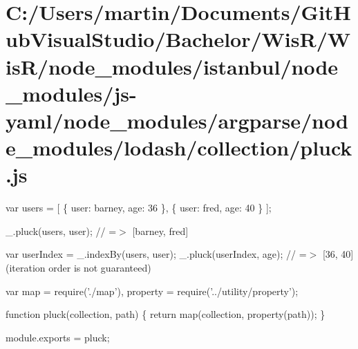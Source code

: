 \hypertarget{_c_1_2_users_2martin_2_documents_2_git_hub_visual_studio_2_bachelor_2_wis_r_2_wis_r_2node_module98a6357a3d51f316514f9300112d9446}{}\section{C\+:/\+Users/martin/\+Documents/\+Git\+Hub\+Visual\+Studio/\+Bachelor/\+Wis\+R/\+Wis\+R/node\+\_\+modules/istanbul/node\+\_\+modules/js-\/yaml/node\+\_\+modules/argparse/node\+\_\+modules/lodash/collection/pluck.\+js}
var users = \mbox{[} \{ \textquotesingle{}user\textquotesingle{}\+: \textquotesingle{}barney\textquotesingle{}, \textquotesingle{}age\textquotesingle{}\+: 36 \}, \{ \textquotesingle{}user\textquotesingle{}\+: \textquotesingle{}fred\textquotesingle{}, \textquotesingle{}age\textquotesingle{}\+: 40 \} \mbox{]};

\+\_\+.\+pluck(users, \textquotesingle{}user\textquotesingle{}); // =$>$ \mbox{[}\textquotesingle{}barney\textquotesingle{}, \textquotesingle{}fred\textquotesingle{}\mbox{]}

var user\+Index = \+\_\+.\+index\+By(users, \textquotesingle{}user\textquotesingle{}); \+\_\+.\+pluck(user\+Index, \textquotesingle{}age\textquotesingle{}); // =$>$ \mbox{[}36, 40\mbox{]} (iteration order is not guaranteed)


\begin{DoxyCodeInclude}
var map = require(\textcolor{stringliteral}{'./map'}),
    \textcolor{keyword}{property} = require(\textcolor{stringliteral}{'../utility/property'});

\textcolor{keyword}{function} pluck(collection, path) \{
  \textcolor{keywordflow}{return} map(collection, property(path));
\}

module.exports = pluck;
\end{DoxyCodeInclude}
 